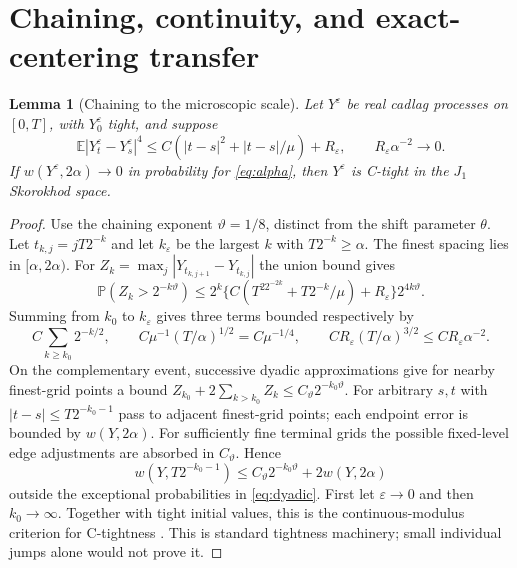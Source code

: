 \documentclass[11pt]{article}
\newcommand{\E}{\mathbb E}
\newcommand{\Prob}{\mathbb P}
\newcommand{\eps}{\varepsilon}
\newtheorem{lemma}[theorem]{Lemma}
\theoremstyle{definition}\newtheorem{definition}[theorem]{Definition}
\theoremstyle{remark}\newtheorem{remark}[theorem]{Remark}
\numberwithin{equation}{section}
\begin{document}
\section{Chaining, continuity, and exact-centering transfer}\label{sec:finish}
\begin{lemma}[Chaining to the microscopic scale]\label{lem:chaining}
Let $Y^\eps$ be real cadlag processes on $[0,T]$, with $Y_0^\eps$ tight,
and suppose
\[
 \E|Y_t^\eps-Y_s^\eps|^4
  \le C(|t-s|^2+|t-s|/\mu)+R_\eps,
 \qquad R_\eps\alpha^{-2}\to0.
\]
If $w(Y^\eps,2\alpha)\to0$ in probability for \eqref{eq:alpha}, then
$Y^\eps$ is C-tight in the $J_1$ Skorokhod space.
\end{lemma}
\begin{proof}
Use the chaining exponent $\vartheta=1/8$, distinct from the shift
parameter $\theta$. Let $t_{k,j}=jT2^{-k}$ and let $k_\eps$ be the largest
$k$ with $T2^{-k}\ge\alpha$. The finest spacing lies in $[\alpha,2\alpha)$.
For $Z_k=\max_j|Y_{t_{k,j+1}}-Y_{t_{k,j}}|$ the union bound gives
\[
 \Prob(Z_k>2^{-k\vartheta})\le
    2^k\{C(T^22^{-2k}+T2^{-k}/\mu)+R_\eps\}2^{4k\vartheta}.
\]
Summing from $k_0$ to $k_\eps$ gives three terms bounded respectively by
\begin{equation}\label{eq:dyadic}
 C\sum_{k\ge k_0}2^{-k/2},\qquad
 C\mu^{-1}(T/\alpha)^{1/2}=C\mu^{-1/4},\qquad
 CR_\eps(T/\alpha)^{3/2}\le CR_\eps\alpha^{-2}.
\end{equation}
On the complementary event, successive dyadic approximations give for
nearby finest-grid points a bound
$Z_{k_0}+2\sum_{k>k_0}Z_k\le C_\vartheta2^{-k_0\vartheta}$.
For arbitrary $s,t$ with $|t-s|\le T2^{-k_0-1}$ pass to adjacent
finest-grid points; each endpoint error is bounded by $w(Y,2\alpha)$.
For sufficiently fine terminal grids the possible fixed-level edge
adjustments are absorbed in $C_\vartheta$. Hence
\[
 w(Y,T2^{-k_0-1})\le
       C_\vartheta2^{-k_0\vartheta}+2w(Y,2\alpha)
\]
outside the exceptional probabilities in \eqref{eq:dyadic}. First let
$\eps\to0$ and then $k_0\to\infty$. Together with tight initial values,
this is the continuous-modulus criterion for C-tightness
\cite[Proposition VI.3.26]{JS}. This is standard tightness machinery;
small individual jumps alone would not prove it.
\end{proof}
\end{document}
